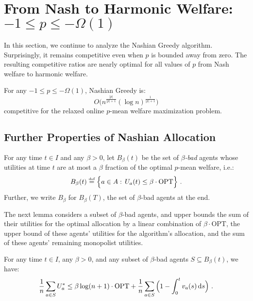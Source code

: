 \documentclass[11pt,letterpaper]{article}
\newcommand{\OPT}{\mathrm{OPT}}
\newcommand{\dif}[1]{\,\text{\rm d} #1}
\newcommand{\utility}{U}
\newcommand{\defeq}{\stackrel{\textrm{\tiny def}}{=}}
\begin{document}
 \section[From Nash to Harmonic Welfare]{From Nash to Harmonic Welfare: $-1 \le p \le - \Omega(1)$}
\label{sec:nash-to-harmonic}

In this section, we  continue to analyze the Nashian Greedy algorithm.
Surprisingly, it remains competitive even when $p$ is bounded away from zero.
The resulting competitive ratios are nearly optimal for all values of $p$ from Nash welfare to harmonic welfare.

\begin{theorem}
	\label{thm:nashian-to-harmonic}
	For any $-1 \le p \le -	\Omega(1)$, Nashian Greedy is:
	\[
		O \Big( n^{\frac{|p|}{|p|+1}} (\log n)^{\frac{1}{|p|+1}} \Big)
	\]
	competitive for the relaxed online $p$-mean welfare maximization problem.
\end{theorem}


\subsection{Further Properties of Nashian Allocation}

\begin{definition}
\label{def:bad}
	For any time $t\in I$ and any $\beta > 0$, let $B_\beta(t)$ be the set of \emph{$\beta$-bad} agents whose utilities at time $t$ are at most a $\beta$ fraction of the optimal $p$-mean welfare, i.e.:
	\[
	    B_{\beta}(t) \defeq \Big\{a\in A:\,\utility_a(t) \leq \beta \cdot \OPT \Big\}
	    ~.
	\]
	Further, we write $B_\beta$ for $B_\beta(T)$, the set of $\beta$-bad agents at the end.
\end{definition}



The next lemma considers a subset of $\beta$-bad agents, and upper bounds the sum of their utilities for the optimal allocation by a linear combination of $\beta \cdot \OPT$, the upper bound of these agents' utilities for the algorithm's allocation, and the sum of these agents' remaining monopolist utilities.

\begin{lemma}
	\label{lem:bad-agents-optimal-utility}
	For any time $t\in I$, any $\beta > 0$, and any subset of $\beta$-bad agents $S \subseteq B_\beta(t)$, we have:
	\[
		\frac{1}{n} \sum_{a\in S} \utility_a^* 
		\leq \beta \log (n+1) \cdot \OPT + \frac{1}{n} \sum_{a\in S} \Big(1-\int_0^t v_a(s) \dif{s} \Big)
	~.
	\]
\end{lemma}
\end{document}

